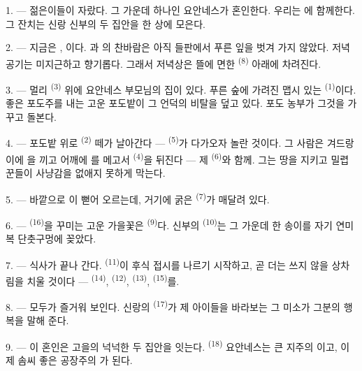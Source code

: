 \VUsaut{3.0mm}

1. --- 젊은이들이 자랐다. 그 가운데 하나인 요안네스가 혼인한다. 우리는
에 함께한다. 그 잔치는 신랑 신부의 두 집안을 한 상에 모은다.

2. --- 지금은 , 이다. 과 의
찬바람은 아직 들판에서 푸른 잎을 벗겨 가지 않았다. 저녁 공기는 미지근하고 향기롭다.
그래서 저녁상은 뜰에 면한  \textsuperscript{(8)} 아래에 차려진다.

3. --- 멀리  \textsuperscript{(3)} 위에 요안네스 부모님의 집이 있다. 푸른
숲에 가려진 맵시 있는  \textsuperscript{(1)}이다. 좋은 포도주를 내는 고운
포도밭이 그 언덕의 비탈을 덮고 있다. 포도 농부가 그것을 가꾸고 돌본다.

4. --- 포도밭 위로  \textsuperscript{(2)} 떼가 날아간다 —
 \textsuperscript{(5)}가 다가오자 놀란 것이다. 그 사람은 겨드랑이에
을 끼고 어깨에 를 메고서 
\textsuperscript{(4)}을 뒤진다 — 제  \textsuperscript{(6)}와 함께. 그는 땅을
지키고 밀렵꾼들이 사냥감을 없애지 못하게 막는다.

5. ---  바깥으로 이 뻗어 오르는데, 거기에 굵은
 \textsuperscript{(7)}가 매달려 있다.

6. ---  \textsuperscript{(16)}을 꾸미는 고운 가을꽃은 
\textsuperscript{(9)}다. 신부의  \textsuperscript{(10)}는 그 가운데 한 송이를
자기 연미복 단춧구멍에 꽂았다.

7. --- 식사가 끝나 간다.  \textsuperscript{(11)}이 후식 접시를 나르기
시작하고, 곧 더는 쓰지 않을 상차림을 치울 것이다 — 
\textsuperscript{(14)},  \textsuperscript{(12)}, 
\textsuperscript{(13)},  \textsuperscript{(15)}를.

\VUsaut{3.0mm}

8. --- 모두가 즐거워 보인다. 신랑의  \textsuperscript{(17)}가 제 아이들을
바라보는 그 미소가 그분의 행복을 말해 준다.

9. --- 이 혼인은 고을의 넉넉한 두 집안을 잇는다.  \textsuperscript{(18)}
요안네스는 큰 지주의 이고, 이제 솜씨 좋은 공장주의 가 된다.

